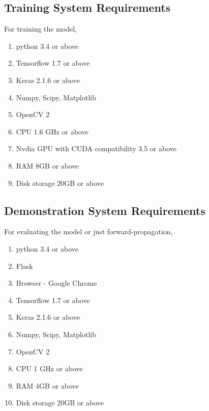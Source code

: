 \subsection{Training System Requirements} %
\label{sub:training_system_requirements}
For training the model,
\begin{enumerate}
    \item python 3.4 or above
    \item Tensorflow 1.7 or above
    \item Keras  2.1.6 or above
    \item Numpy, Scipy, Matplotlib
    \item OpenCV 2
    \item CPU 1.6 GHz or above
    \item Nvdia GPU with CUDA compatibility 3.5 or above
    \item RAM 8GB or above
    \item Disk storage 20GB or above
\end{enumerate}

\subsection{Demonstration System Requirements} %
\label{sub:demonstration_system_requirements}
For evaluating the model or just forward-propagation,
\begin{enumerate}
    \item python 3.4 or above
    \item Flask
    \item Browser - Google Chrome
    \item Tensorflow 1.7 or above
    \item Keras  2.1.6 or above
    \item Numpy, Scipy, Matplotlib
    \item OpenCV 2
    \item CPU 1 GHz or above
    \item RAM 4GB or above
    \item Disk storage 20GB or above
\end{enumerate}
